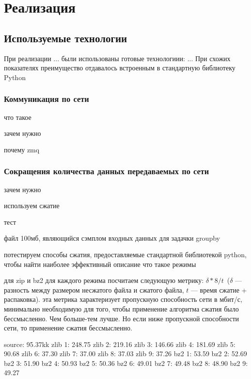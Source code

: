 \documentclass[12pt,a4paper,oneside]{extarticle}
\begin{document}
\section{Реализация}
    \subsection{Используемые технологии}
        При реализации ... были использованы готовые технологиии: ...
        При схожих показателях преимущество отдавалось встроенным в стандартную библиотеку Python

        \subsubsection{Коммуникация по сети}
            что такое

            зачем нужно

            почему zmq
        \subsubsection{Сокращения количества данных передаваемых по сети} %
            зачем  нужно

            используем сжатие

            тест


            файл 100мб, являющийся сэмплом входных данных для задачки groupby

            потестируем способы сжатия, предоставляемые стандартной библиотекой python, чтобы найти наиболее эффективный
            описание что такое режимы

            для zip и bz2 для каждого режима посчитаем следующую метрику: $\delta*8/t$~($\delta$ --- разность между размером несжатого файла и сжатого файла, $t$ --- время сжатие + распаковка).
            эта метрика характеризует пропускную способность сети в мбит/с, минимально необходимую для того, чтобы применение алгоритма сжатия было бессмысленно.
            Чем больше-тем лучше. Но если ниже пропускной способности сети, то применение сжатия бессмысленно.


            source: 95.37kk
            zlib 1: 248.75
            zlib 2: 219.16
            zlib 3: 146.66
            zlib 4: 181.69
            zlib 5: 90.68
            zlib 6: 37.30
            zlib 7: 37.00
            zlib 8: 37.03
            zlib 9: 37.26
            bz2 1: 53.59
            bz2 2: 52.69
            bz2 3: 51.90
            bz2 4: 50.93
            bz2 5: 50.36
            bz2 6: 49.01
            bz2 7: 49.48
            bz2 8: 48.90
            bz2 9: 49.27
\end{document}
